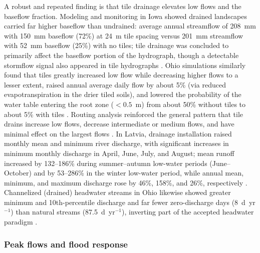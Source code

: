\documentclass[11pt]{article}
\begin{document}
A robust and repeated finding is that tile drainage elevates low flows and the baseflow fraction. Modeling and monitoring in Iowa showed drained landscapes carried far higher baseflow than undrained: average annual streamflow of 208~mm with 150~mm baseflow (72\%) at 24~m tile spacing versus 201~mm streamflow with 52~mm baseflow (25\%) with no tiles; tile drainage was concluded to primarily affect the baseflow portion of the hydrograph, though a detectable stormflow signal also appeared in tile hydrographs \parencite{Schilling2008}. Ohio simulations similarly found that tiles greatly increased low flow while decreasing higher flows to a lesser extent, raised annual average daily flow by about 5\% (via reduced evapotranspiration in the drier tiled soils), and lowered the probability of the water table entering the root zone ($<0.5$~m) from about 50\% without tiles to about 5\% with tiles \parencite{Rathore2025}. Routing analysis reinforced the general pattern that tile drains increase low flows, decrease intermediate or medium flows, and have minimal effect on the largest flows \parencite{Sloan2017}. In Latvia, drainage installation raised monthly mean and minimum river discharge, with significant increases in minimum monthly discharge in April, June, July, and August; mean runoff increased by 132--186\% during summer--autumn low-water periods (June--October) and by 53--286\% in the winter low-water period, while annual mean, minimum, and maximum discharge rose by 46\%, 158\%, and 26\%, respectively \parencite{Apsite2017}. Channelized (drained) headwater streams in Ohio likewise showed greater minimum and 10th-percentile discharge and far fewer zero-discharge days (8~d~yr$^{-1}$) than natural streams (87.5~d~yr$^{-1}$), inverting part of the accepted headwater paradigm \parencite{King2009}.

\subsubsection{Peak flows and flood response}
\end{document}

